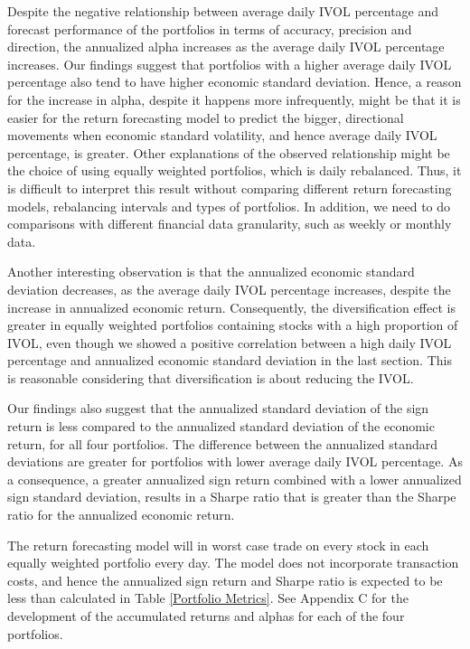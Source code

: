Despite the negative relationship between average daily IVOL percentage and forecast performance of the portfolios in terms of accuracy, precision and direction, the annualized alpha increases as the average daily IVOL percentage increases. Our findings suggest that portfolios with a higher average daily IVOL percentage also tend to have higher economic standard deviation. Hence, a reason for the increase in alpha, despite it happens more infrequently, might be that it is easier for the return forecasting model to predict the bigger, directional movements when economic standard volatility, and hence average daily IVOL percentage, is greater. Other explanations of the observed relationship might be the choice of using equally weighted portfolios, which is daily rebalanced. Thus, it is difficult to interpret this result without comparing different return forecasting models, rebalancing intervals and types of portfolios. In addition, we need to do comparisons with different financial data granularity, such as weekly or monthly data.

Another interesting observation is that the annualized economic standard deviation decreases, as the average daily IVOL percentage increases, despite the increase in annualized economic return. Consequently, the diversification effect is greater in equally weighted portfolios containing stocks with a high proportion of IVOL, even though we showed a positive correlation between a high daily IVOL percentage and annualized economic standard deviation in the last section. This is reasonable considering that diversification is about reducing the IVOL.

Our findings also suggest that the annualized standard deviation of the sign return is less compared to the annualized standard deviation of the economic return, for all four portfolios. The difference between the annualized standard deviations are greater for portfolios with lower average daily IVOL percentage. As a consequence, a greater annualized sign return combined with a lower annualized sign standard deviation, results in a Sharpe ratio that is greater than the Sharpe ratio for the annualized economic return. 

The return forecasting model will in worst case trade on every stock in each equally weighted portfolio every day. The model does not incorporate transaction costs, and hence the annualized sign return and Sharpe ratio is expected to be less than calculated in Table \ref{Portfolio Metrics}. See Appendix C for the development of the accumulated returns and alphas for each of the four portfolios. 

